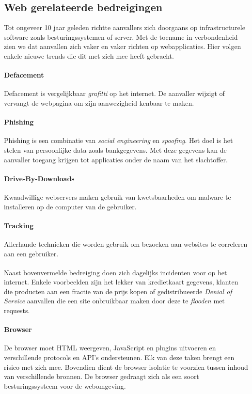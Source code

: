 \documentclass[../main.tex]{subfiles}
\begin{document}
\subsection{Web gerelateerde bedreigingen}
Tot ongeveer 10 jaar geleden richtte aanvallers zich doorgaans op infrastructurele software zoals besturingssystemen of server. Met de toename in verbondenheid zien we dat aanvallen zich vaker en vaker richten op webapplicaties. Hier volgen enkele nieuwe trends die dit met zich mee heeft gebracht.

\paragraph{Defacement} Defacement is vergelijkbaar \textit{grafitti} op het internet. De aanvaller wijzigt of vervangt de webpagina om zijn aanwezigheid kenbaar te maken. 

\paragraph{Phishing} Phishing is een combinatie van \textit{social engineering} en \textit{spoofing}. Het doel is het stelen van persoonlijke data zoals bankgegevens. Met deze gegevens kan de aanvaller toegang krijgen tot applicaties onder de naam van het slachtoffer.

\paragraph{Drive-By-Downloads} Kwaadwillige webservers maken gebruik van kwetsbaarheden om malware te installeren op de computer van de gebruiker.

\paragraph{Tracking} Allerhande technieken die worden gebruik om bezoeken aan websites te correleren aan een gebruiker. 
\\\\
Naast bovenvermelde bedreiging doen zich dagelijks incidenten voor op het internet. Enkele voorbeelden zijn het lekker van kredietkaart gegevens, klanten die producten aan een fractie van de prijs kopen of gedistribueerde \textit{Denial of Service} aanvallen die een site onbruikbaar maken door deze te \textit{flooden} met requests.



\paragraph{Browser} De browser moet HTML weergeven, JavaScript en plugins uitvoeren en verschillende protocols en API's ondersteunen. Elk van deze taken brengt een risico met zich mee. Bovendien dient de browser isolatie te voorzien tussen inhoud van verschillende bronnen. De browser gedraagt zich als een soort besturingssysteem voor de webomgeving.
\end{document}
